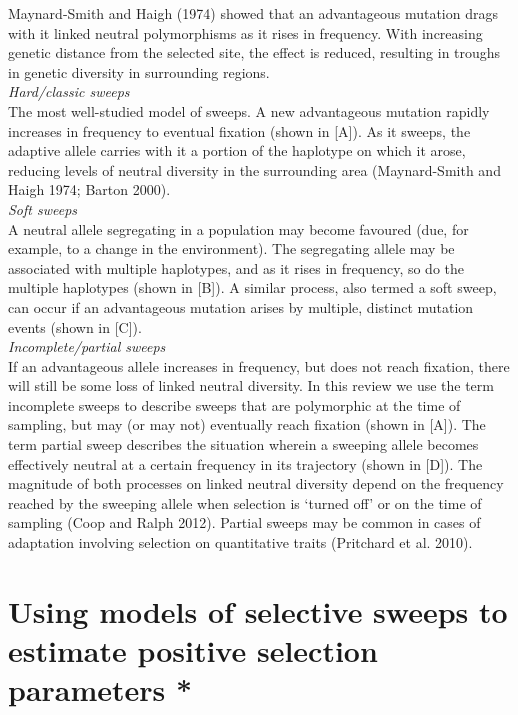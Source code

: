 Maynard-Smith and Haigh (1974) showed that an advantageous mutation drags with it linked neutral polymorphisms as it rises in frequency. With increasing genetic distance from the selected site, the effect is reduced, resulting in troughs in genetic diversity in surrounding regions. \\
 
\emph{Hard/classic sweeps} \\
 
The most well-studied model of sweeps. A new advantageous mutation rapidly increases in frequency to eventual fixation (shown in [A]). As it sweeps, the adaptive allele carries with it a portion of the haplotype on which it arose, reducing levels of neutral diversity in the surrounding area (Maynard-Smith and Haigh 1974; Barton 2000). \\
 
\emph{Soft sweeps} \\
  
A neutral allele segregating in a population may become favoured (due, for example, to a change in the environment). The segregating allele may be associated with multiple haplotypes, and as it rises in frequency, so do the multiple haplotypes (shown in [B]). A similar process, also termed a soft sweep, can occur if an advantageous mutation arises by multiple, distinct mutation events (shown in [C]). \\
 
\emph{Incomplete/partial sweeps} \\
 
If an advantageous allele increases in frequency, but does not reach fixation, there will still be some loss of linked neutral diversity. In this review we use the term incomplete sweeps to describe sweeps that are polymorphic at the time of sampling, but may (or may not) eventually reach fixation (shown in [A]). The term partial sweep describes the situation wherein a sweeping allele becomes effectively neutral at a certain frequency in its trajectory (shown in [D]). The magnitude of both processes on linked neutral diversity depend on the frequency reached by the sweeping allele when selection is ‘turned off’ or on the time of sampling (Coop and Ralph 2012). Partial sweeps may be common in cases of adaptation involving selection on quantitative traits (Pritchard et al. 2010). \\

\section[Using models of selective sweeps to estimate positive selection parameters]{Using models of selective sweeps to estimate positive selection parameters *}
 
